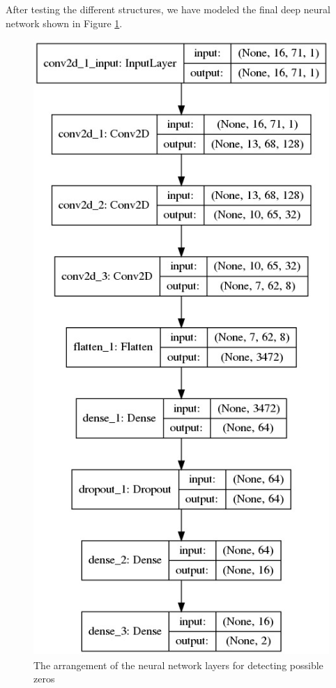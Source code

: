\documentclass{bmcart}
\begin{document}
After testing the different structures, we have modeled the final deep neural network shown in Figure
\ref{CNNModel}.
\begin{figure}[!h]
	\centering
	\includegraphics[scale=0.4]{ModelSelection/model.jpg}
	\caption{The arrangement of the neural network layers for detecting possible zeros}
	\label{CNNModel}
\end{figure}
\end{document}
